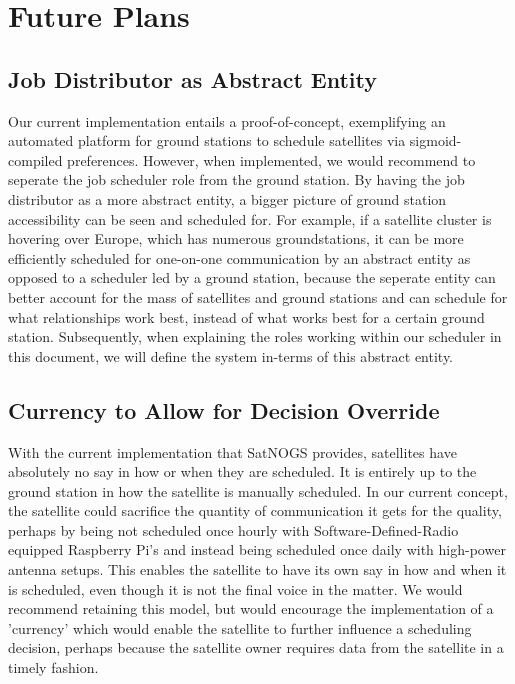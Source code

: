 \documentclass{article}
\begin{document}
\section{Future Plans}

\subsection{Job Distributor as Abstract Entity}

Our current implementation entails a proof-of-concept, exemplifying an automated platform for ground stations to schedule satellites via sigmoid-compiled preferences. However, when implemented, we would recommend to seperate the job scheduler role from the ground station. By having the job distributor as a more abstract entity, a bigger picture of ground station accessibility can be seen and scheduled for. For example, if a satellite cluster is hovering over Europe, which has numerous groundstations, it can be more efficiently scheduled for one-on-one communication by an abstract entity as opposed to a scheduler led by a ground station, because the seperate entity can better account for the mass of satellites and ground stations and can schedule for what relationships work best, instead of what works best for a certain ground station. Subsequently, when explaining the roles working within our scheduler in this document, we will define the system in-terms of this abstract entity.

\subsection{Currency to Allow for Decision Override}

With the current implementation that SatNOGS provides, satellites have absolutely no say in how or when they are scheduled. It is entirely up to the ground station in how the satellite is manually scheduled. In our current concept, the satellite could sacrifice the quantity of communication it gets for the quality, perhaps by being not scheduled once hourly with Software-Defined-Radio equipped Raspberry Pi's and instead being scheduled once daily with high-power antenna setups. This enables the satellite to have its own say in how and when it is scheduled, even though it is not the final voice in the matter. We would recommend retaining this model, but would encourage the implementation of a 'currency' which would enable the satellite to further influence a scheduling decision, perhaps because the satellite owner requires data from the satellite in a timely fashion.
\end{document}
